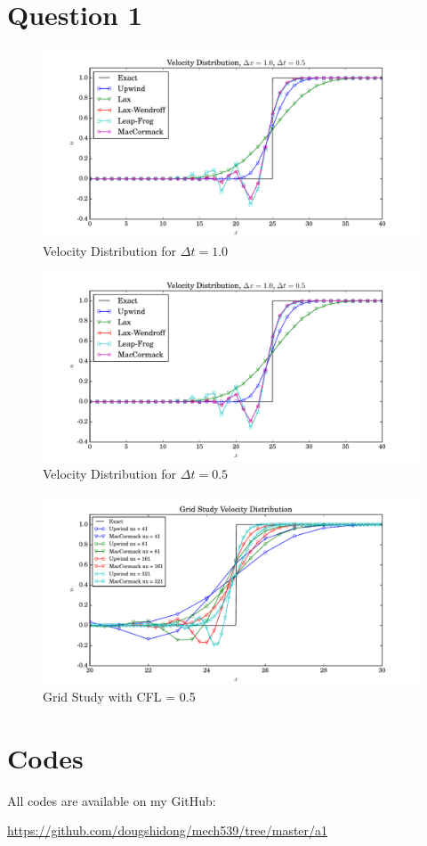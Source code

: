 \documentclass[letterpaper,12pt,]{article}
\begin{document}


\section*{Question 1}

\begin{figure}
    \centering
    \includegraphics[width = \textwidth]{./Figures/q1_1}
    \caption{Velocity Distribution for $\Delta t = 1.0$}
    \label{fig:q11}
\end{figure}

\begin{figure}
    \centering
    \includegraphics[width = \textwidth]{./Figures/q1_2}
    \caption{Velocity Distribution for $\Delta t = 0.5$}
    \label{fig:q12}
\end{figure}

\begin{figure}
    \centering
    \includegraphics[width = \textwidth]{./Figures/q2}
    \caption{Grid Study with CFL = 0.5}
    \label{fig:q2}
\end{figure}

\section*{Codes}

All codes are available on my GitHub:

\url{https://github.com/dougshidong/mech539/tree/master/a1}
\end{document}
